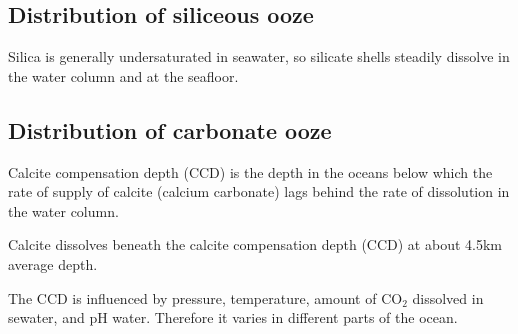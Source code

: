 \subsection{Distribution of siliceous ooze}

Silica is generally undersaturated in seawater, so silicate shells steadily
dissolve in the water column and at the seafloor.

\subsection{Distribution of carbonate ooze}

Calcite compensation depth (CCD) is the depth in the oceans below which the
rate of supply of calcite (calcium carbonate) lags behind the rate of
dissolution in the water column.

Calcite dissolves beneath the calcite compensation depth (CCD) at about 4.5km
average depth.

The CCD is influenced by pressure, temperature, amount of CO$_2$ dissolved in
sewater, and pH water. Therefore it varies in different parts of the ocean.

